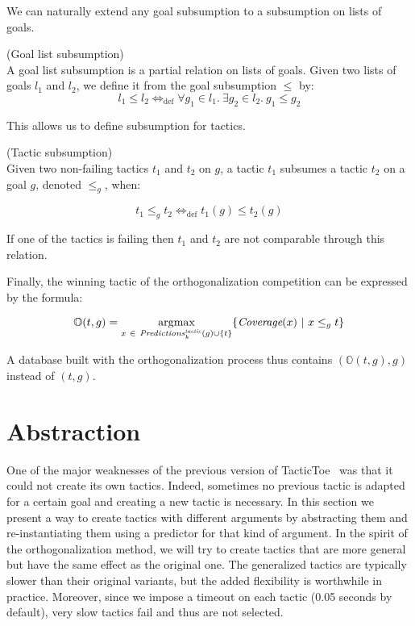 \documentclass[runningheads,a4paper,draft]{svjour3}
\DeclareMathOperator*{\argmax}{\arg\!\max}
\def\tactictoe{\textsf{TacticToe}\xspace}
\begin{document}
We can naturally extend any goal subsumption to a subsumption on
lists of goals.
\begin{definition} (Goal list subsumption)\\
A goal list subsumption is a partial relation on lists of goals.
Given two lists of goals $l_1$ and $l_2$, we define it from the goal
subsumption $\le$ by:
\[l_1 \le l_2  \Leftrightarrow_{\mathrm{def}} \forall g_1 \in l_1.\ \exists g_2 \in l_2.\
g_1 \le g_2\]
\end{definition}

This allows us to define subsumption for tactics.
\begin{definition}\label{def:tacsub}(Tactic subsumption)\\
Given two non-failing tactics $t_1$ and $t_2$ on $g$, a tactic $t_1$ subsumes a
tactic $t_2$ on a goal $g$, denoted $\le_g$, when:

\[t_1 \le_g t_2 \Leftrightarrow_{\mathrm{def}} t_1(g) \le t_2(g)\]

If one of the tactics is failing then $t_1$ and $t_2$ are not comparable through
this relation.
\end{definition}

Finally, the winning tactic of the orthogonalization competition can be
expressed by the formula:

\[\mathbb{O}(t,g) = \argmax_{x\ \in\
\mathit{Predictions}^{\mathit{tactic}}_k(g) \cup
\lbrace t
\rbrace} \lbrace
\textit{\mbox{Coverage}}(x)\
|\ x \le_g t\rbrace\]

A database built with the orthogonalization process thus contains
$(\mathbb{O}(t,g),g)$ instead of $(t,g)$.

\section{Abstraction}\label{sec:synthesis}
One of the major weaknesses of the previous version of 
\tactictoe~\cite{tgckju-lpar17} was that
it could not create its own tactics. Indeed, sometimes no previous tactic is
adapted for a certain goal and creating a new tactic is necessary.
In this section we present a way to create tactics with different arguments
by abstracting them and re-instantiating them using a predictor for that kind
of argument. In the spirit of the orthogonalization method, we will try to
create tactics that are more general but have the same effect as the
original one. The generalized tactics are typically slower than their
original variants, but the added flexibility is worthwhile in practice. Moreover,
since we impose a timeout on each tactic (0.05 seconds by default), very slow
tactics fail and thus are not selected.
\end{document}
